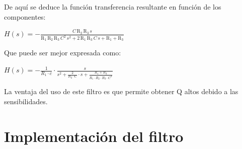 \documentclass[../../tc_tp5_main.tex]{subfiles}
\begin{document}
	De aquí se deduce la función transferencia resultante en función de los componentes: \par
	
	\begin{centering}
	$H(s) = -\frac{C\, \mathrm{R_2}\, \mathrm{R_3}\, s}{\mathrm{R_1}\, \mathrm{R_2}\, \mathrm{R_3}\, C^2\, s^2 + 2\, 		\mathrm{R_1}\, \mathrm{R_3}\, C\, s + \mathrm{R_1} + \mathrm{R_3}}$
 \end{centering}
	\par Que puede ser mejor expresada como: \par
	\begin{centering}
	$H(s) = -\frac{1}{R_1\cdot c}\cdot \frac{s}{s^2 + \frac{2}{R_2\cdot C} \cdot s + \frac{R_1 + R_3}{R_1\cdot R_2 \cdot R_3 \cdot C^2}}$
	\end{centering}
	\par
	
	La ventaja del uso de este filtro es que permite obtener Q altos debido a las sensibilidades.\par
	
	\section{Implementación del filtro}
	
\end{document}
